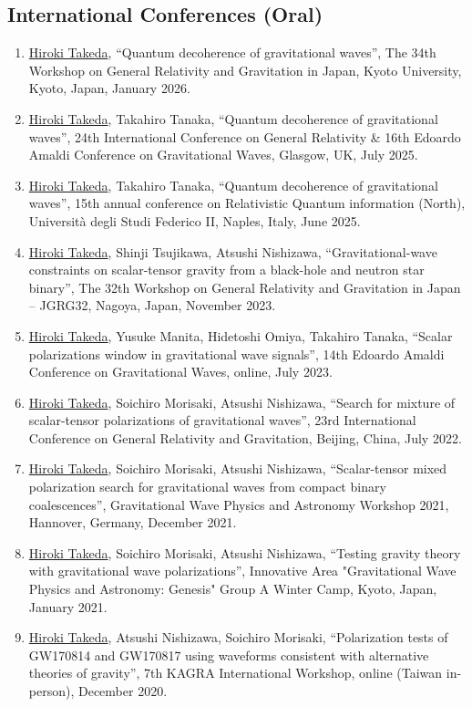 \documentclass[uplatex, 12pt]{article}
\begin{document}
\subsection*{International Conferences (Oral)}
\begin{enumerate}
\item \uline{Hiroki Takeda}, “Quantum decoherence of gravitational waves”, The 34th Workshop on General Relativity and Gravitation in Japan, Kyoto University, Kyoto, Japan, January 2026.
\item \uline{Hiroki Takeda}, Takahiro Tanaka, “Quantum decoherence of gravitational waves”, 24th International Conference on General Relativity \& 16th Edoardo Amaldi Conference on Gravitational Waves, Glasgow, UK, July 2025.
\item \uline{Hiroki Takeda}, Takahiro Tanaka, “Quantum decoherence of gravitational waves”, 15th annual conference on Relativistic Quantum information (North), Università degli Studi Federico II, Naples, Italy, June 2025.
\item \uline{Hiroki Takeda}, Shinji Tsujikawa, Atsushi Nishizawa, “Gravitational-wave constraints on scalar-tensor gravity from a black-hole and neutron star binary”, The 32th Workshop on General Relativity and Gravitation in Japan -- JGRG32, Nagoya, Japan, November 2023.
\item \uline{Hiroki Takeda}, Yusuke Manita, Hidetoshi Omiya, Takahiro Tanaka, “Scalar polarizations window in gravitational wave signals”, 14th Edoardo Amaldi Conference on Gravitational Waves, online, July 2023.
\item \uline{Hiroki Takeda}, Soichiro Morisaki, Atsushi Nishizawa, “Search for mixture of scalar-tensor polarizations of gravitational waves”, 23rd International Conference on General Relativity and Gravitation, Beijing, China, July 2022.
\item \uline{Hiroki Takeda}, Soichiro Morisaki, Atsushi Nishizawa, “Scalar-tensor mixed polarization search for gravitational waves from compact binary coalescences”, Gravitational Wave Physics and Astronomy Workshop 2021, Hannover, Germany, December 2021.
\item \uline{Hiroki Takeda}, Soichiro Morisaki, Atsushi Nishizawa, “Testing gravity theory with gravitational wave polarizations”, Innovative Area "Gravitational Wave Physics and Astronomy: Genesis" Group A Winter Camp, Kyoto, Japan, January 2021.
\item \uline{Hiroki Takeda}, Atsushi Nishizawa, Soichiro Morisaki, “Polarization tests of GW170814 and GW170817 using waveforms consistent with alternative theories of gravity”, 7th KAGRA International Workshop, online (Taiwan in-person), December 2020.

\end{enumerate}
\end{document}
